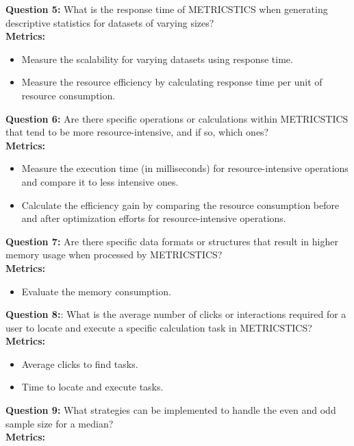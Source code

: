 \vspace{10pt}
\textbf{Question 5:} What is the response time of METRICSTICS when generating descriptive statistics for datasets of varying sizes? \\
\textbf{Metrics:}
\begin{itemize}
    \item Measure the scalability for varying datasets using response time. 

    \item  Measure the resource efficiency by calculating response time per unit of resource consumption.
\end{itemize}
\vspace{10pt}
\textbf{Question 6:} Are there specific operations or calculations within METRICSTICS that tend to be more resource-intensive, and if so, which ones? 
 \\
\textbf{Metrics:}
\begin{itemize}
    \item Measure the execution time (in milliseconds) for resource-intensive operations and compare it to less intensive ones.
    \item Calculate the efficiency gain by comparing the resource consumption before and after optimization efforts for resource-intensive operations.
\end{itemize}
\vspace{10pt}
\textbf{Question 7:} Are there specific data formats or structures that result in higher memory usage when processed by METRICSTICS? \\
\textbf{Metrics:}
\begin{itemize}
    \item  Evaluate the memory consumption. 
\end{itemize}
\vspace{10pt}
\textbf{Question 8:}: What is the average number of clicks or interactions required for a user to locate and execute a specific calculation task in METRICSTICS? \\
\textbf{Metrics:}
\begin{itemize}
    \item Average clicks to find tasks.
    \item Time to locate and execute tasks.
\end{itemize}
\vspace{10pt}
\textbf{Question 9:} What strategies can be implemented to handle the even and odd sample size for a median? \\
\textbf{Metrics:}

